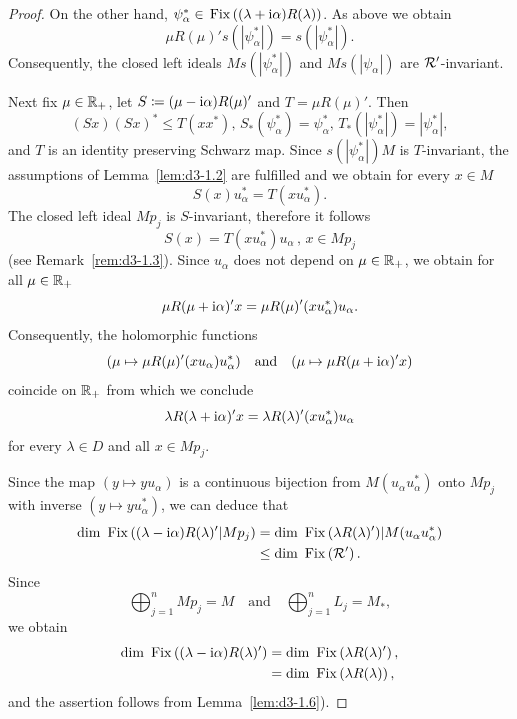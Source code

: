 \begin{proof}
On the other hand, $\psi_{\alpha}^{*} \in \mathop{}\mathrm{Fix}\left((\lambda + \mathrm{i}\alpha)R(\lambda)\right)$.
As above we obtain
\[
\mu R(\mu)'s(|\psi_{\alpha}^{*}|) = s(|\psi_{\alpha}^{*}|) .
\]
Consequently, the closed left ideals $Ms(|\psi_{\alpha}^{*}|)$ and $Ms(|\psi_{\alpha}|)$ are $\mathcal{R}'$-invariant.

Next fix $\mu \in \mathbb{R}_{+}$, let $S \coloneq (\mu - \mathrm{i}\alpha)R(\mu)'$ and $T = \mu R(\mu)'$.
Then 
%
\[
	(Sx)(Sx)^{*} \leq T(xx^{*}), \,
	S_{*}(\psi_{\alpha}^{*}) = \psi_{\alpha}^{*}, \,
	T_{*}(|\psi_{\alpha}^{*}|) = |\psi_{\alpha}^{*}|, 
\]
%
and $T$ is an identity preserving Schwarz map.
Since $s(|\psi_{\alpha}^{*}|)M$ is $T$-invariant, the assumptions of Lemma~\ref{lem:d3-1.2} are fulfilled and we obtain for every $x \in M$
\[
	S(x)u_{\alpha}^{*} = T(xu_{\alpha}^{*}) .
\]
The closed left ideal $Mp_{j}$ is $S$-invariant, therefore it follows
\[
S(x) = T(xu_{\alpha}^{*})u_{\alpha} \, , \, x \in Mp_{j}
\]
(see Remark~\ref{rem:d3-1.3}).
Since $u_{\alpha}$ does not depend on $\mu \in \mathbb{R}_{+}$, we obtain for all $\mu \in \mathbb{R}_{+}$
\[
\mu R(\mu+\mathrm{i}\alpha)'x = \mu R(\mu)'(xu_{\alpha}^{*})u_{\alpha}.
\]
Consequently, the holomorphic functions 
%
\[
	(\mu \mapsto \mu R(\mu)'(x u_{\alpha})u_{\alpha}^{*})
	\quad \text{and} \quad
	(\mu \mapsto \mu R(\mu+\mathrm{i}\alpha)'x)
\]
%
coincide on $\mathbb{R}_{+}$ from which we conclude
\[
\lambda R(\lambda+\mathrm{i}\alpha)'x = \lambda R(\lambda)'(xu_{\alpha}^{*})u_{\alpha}
\]
for every $\lambda \in D$ and all $x \in Mp_{j}$.

Since the map $(y \mapsto y u_{\alpha})$ is a continuous bijection from $M(u_{\alpha}u_{\alpha}^{*})$ onto $Mp_{j}$ with inverse $(y \mapsto y u_{\alpha}^{*})$, we can deduce that
\begin{align*}
\dim \Fix  {(\lambda-\im\alpha)R(\lambda)'|Mp_{j}} 
	&= \dim \Fix  {\lambda R(\lambda)')|M(u_{\alpha}u_{\alpha}^{*}}  \\
 	&\leq \dim \Fix  {\RR'} .
\end{align*}
Since 
%
\[
	\bigoplus_{j=1}^{n} Mp_{j} = M 
	\quad \text{and} \quad 
	\bigoplus_{j=1}^{n} L_{j} = M_{*},
\]
%
we obtain
\begin{align*}
\mathop{}\!\mathrm{dim}\, \mathop{}\mathrm{Fix}\left((\lambda - \mathrm{i}\alpha)R(\lambda)'\right) &= \mathop{}\!\mathrm{dim}\, \mathop{}\mathrm{Fix}\left(\lambda R(\lambda)'\right) , \\
		&= \mathop{}\!\mathrm{dim}\, \mathop{}\mathrm{Fix}\left(\lambda R(\lambda)\right) ,
\end{align*}
and the assertion follows from Lemma~\ref{lem:d3-1.6}).
\end{proof}
